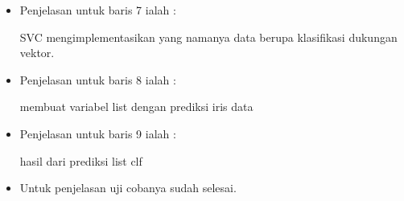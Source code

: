 \begin{enumerate}
\begin{itemize}
\begin{enumerate}
\begin{itemize}
\begin{itemize}
\item Penjelasan untuk baris 7 ialah : 
\par SVC mengimplementasikan yang namanya data berupa klasifikasi dukungan vektor.
\par
\par
\item Penjelasan untuk baris 8 ialah :
\par membuat variabel list dengan prediksi iris data 
\par
\item Penjelasan untuk baris 9 ialah :
\par hasil dari prediksi list clf
\par
\item Untuk penjelasan uji cobanya sudah selesai.
\par
\end{itemize}
\end{itemize}


\end{enumerate}
\end{itemize}
\end{enumerate}
